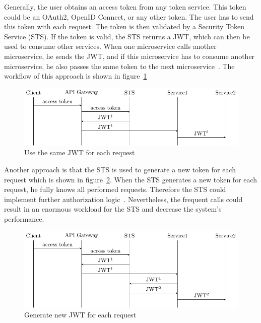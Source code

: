 Generally, the user obtains an access token from any token service.
This token could be an OAuth2, OpenID Connect, or any other token.
The user has to send this token with each request.
The token is then validated by a Security Token Service (STS).
If the token is valid, the STS returns a JWT, which can then be used to consume other services.
When one microservice calls another microservice, he sends the JWT, and if this microservice has to consume another microservice, he also passes the same token to the next microservice~\cite{dias2020microservices}.
The workflow of this approach is shown in figure~\ref{fig:mtls_id_1}
\begin{figure}
	\centering
	\includegraphics{images/authentication-mechanisms/TikZ_jwt_identity_1.pdf}
	\caption{Use the same JWT for each request~\cite{dias2020microservices}}
	\label{fig:mtls_id_1}
\end{figure}

Another approach is that the STS is used to generate a new token for each request which is shown in figure~\ref{fig:mtls_id_2}.
When the STS generates a new token for each request, he fully knows all performed requests.
Therefore the STS could implement further authorization logic~\cite{dias2020microservices}.
Nevertheless, the frequent calls could result in an enormous workload for the STS and decrease the system's performance.

\begin{figure}[H]
	\centering
	\includegraphics{images/authentication-mechanisms/TikZ_jwt_identity_2.pdf}
	\caption{Generate new JWT for each request~\cite{dias2020microservices}}
	\label{fig:mtls_id_2}
\end{figure}

